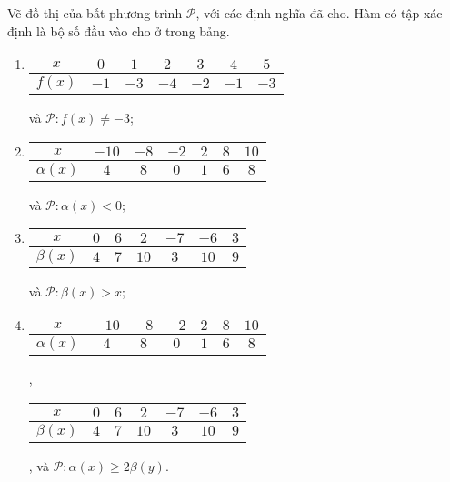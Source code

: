  Vẽ đồ thị của bất phương trình $\mathcal{P}$, với các định nghĩa đã cho. Hàm có tập xác định là bộ số đầu vào cho ở trong bảng.
\begin{enumerate}
   \item 
   \begin{tabular}{|c|c|c|c|c|c|c|}
      \hline
      $x$ & $0$ & $1$ & $2$ & $3$ & $4$ & $5$ \\
      \hline
      $f(x)$ & $-1$ & $-3$ & $-4$ & $-2$ & $-1$ & $-3$\\
      \hline
   \end{tabular} và $\mathcal{P}:f(x) \neq -3$;

   \item 
   \begin{tabular}{|c|c|c|c|c|c|c|}
      \hline
      $x$ & $-10$ & $-8$ & $-2$ & $2$ & $8$ & $10$ \\
      \hline
      $\alpha(x)$ & $4$ & $8$ & $0$ & $1$ & $6$ & $8$\\
      \hline
   \end{tabular} và $\mathcal{P}:\alpha(x) < 0$;

   \item 
   \begin{tabular}{|c|c|c|c|c|c|c|}
      \hline
      $x$ & $0$ & $6$ & $2$ & $-7$ & $-6$ & $3$ \\
      \hline
      $\beta(x)$ & $4$ & $7$ & $10$ & $3$ & $10$ & $9$\\
      \hline
   \end{tabular} và $\mathcal{P}:\beta(x) > x$;

   \item 
   \begin{tabular}{|c|c|c|c|c|c|c|}
      \hline
      $x$ & $-10$ & $-8$ & $-2$ & $2$ & $8$ & $10$ \\
      \hline
      $\alpha(x)$ & $4$ & $8$ & $0$ & $1$ & $6$ & $8$\\
      \hline
   \end{tabular},
   \begin{tabular}{|c|c|c|c|c|c|c|}
      \hline
      $x$ & $0$ & $6$ & $2$ & $-7$ & $-6$ & $3$ \\
      \hline
      $\beta(x)$ & $4$ & $7$ & $10$ & $3$ & $10$ & $9$\\
      \hline
   \end{tabular}, và $\mathcal{P}:\alpha(x) \geq 2\beta(y)$.
\end{enumerate}


